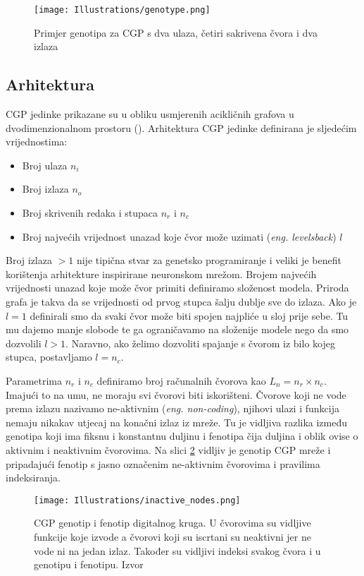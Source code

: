 \begin{figure}
	\centering
	\texttt{[image: Illustrations/genotype.png]}
	\caption{Primjer genotipa za CGP s dva ulaza, četiri sakrivena čvora i dva izlaza}
	\label{fig:genotype}
\end{figure}

\subsection{Arhitektura}
CGP jedinke prikazane su u obliku usmjerenih acikličnih grafova u dvodimenzionalnom prostoru (\cite{cgp}).
Arhitektura CGP jedinke definirana je sljedećim vrijednostima:
\begin{itemize}
	\item Broj ulaza $n_i$
	\item Broj izlaza $n_o$
	\item Broj skrivenih redaka i stupaca $n_r$ i $n_c$
	\item Broj najvećih vrijednost unazad koje čvor može uzimati (\emph{eng. levelsback}) $l$
\end{itemize}
Broj izlaza $>1$ nije tipična stvar za genetsko programiranje i veliki je benefit korištenja arhitekture inspirirane neuronskom mrežom.
Brojem najvećih vrijednosti unazad koje može čvor primiti definiramo složenost modela.
Priroda grafa je takva da se vrijednosti od prvog stupca šalju dublje sve do izlaza.
Ako je $l = 1$ definirali smo da svaki čvor može biti spojen najpliće u sloj prije sebe.
Tu mu dajemo manje slobode te ga ograničavamo na složenije modele nego da smo dozvolili $l > 1$.
Naravno, ako želimo dozvoliti spajanje s čvorom iz bilo kojeg stupca, postavljamo  $l=n_c$.

Parametrima $n_r$ i $n_c$ definiramo broj računalnih čvorova kao $L_n = n_r \times n_c$.
Imajući to na umu, ne moraju svi čvorovi biti iskorišteni.
Čvorove koji ne vode prema izlazu nazivamo ne-aktivnim (\emph{eng. non-coding}), njihovi ulazi i funkcija nemaju nikakav utjecaj na konačni izlaz iz mreže.
Tu je vidljiva razlika između genotipa koji ima fiksnu i konstantnu duljinu i fenotipa čija duljina i oblik ovise o aktivnim i neaktivnim čvorovima.
Na slici \ref{fig:cgp_gene_feno} vidljiv je genotip CGP mreže i pripadajući fenotip s jasno označenim ne-aktivnim čvorovima i pravilima indeksiranja.

\begin{figure}
	\centering
	\texttt{[image: Illustrations/inactive\_nodes.png]}
	\caption{CGP genotip i fenotip digitalnog kruga. U čvorovima su vidljive funkcije koje izvode a čvorovi koji su iscrtani su neaktivni jer ne vode ni na jedan izlaz. Također su vidljivi indeksi svakog čvora i u genotipu i fenotipu. Izvor \cite{cgp}}
	\label{fig:cgp_gene_feno}
\end{figure}

